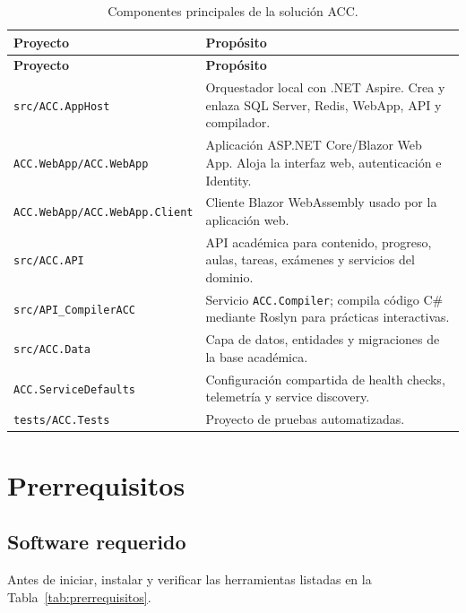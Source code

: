 \documentclass[12pt,letterpaper]{article}
\begin{document}
\begin{longtable}{p{}p{}}
\caption{Componentes principales de la soluci\'on ACC.}
\label{tab:componentes}\\
\toprule
\textbf{Proyecto} & \textbf{Prop\'osito} \\
\midrule
\endfirsthead
\toprule
\textbf{Proyecto} & \textbf{Prop\'osito} \\
\midrule
\endhead
\texttt{src/ACC.AppHost} & Orquestador local con .NET Aspire. Crea y enlaza SQL Server, Redis, WebApp, API y compilador. \\
\texttt{ACC.WebApp/ACC.WebApp} & Aplicaci\'on ASP.NET Core/Blazor Web App. Aloja la interfaz web, autenticaci\'on e Identity. \\
\texttt{ACC.WebApp/ACC.WebApp.Client} & Cliente Blazor WebAssembly usado por la aplicaci\'on web. \\
\texttt{src/ACC.API} & API acad\'emica para contenido, progreso, aulas, tareas, ex\'amenes y servicios del dominio. \\
\texttt{src/API\_CompilerACC} & Servicio \texttt{ACC.Compiler}; compila c\'odigo C\# mediante Roslyn para pr\'acticas interactivas. \\
\texttt{src/ACC.Data} & Capa de datos, entidades y migraciones de la base acad\'emica. \\
\texttt{ACC.ServiceDefaults} & Configuraci\'on compartida de health checks, telemetr\'ia y service discovery. \\
\texttt{tests/ACC.Tests} & Proyecto de pruebas automatizadas. \\
\bottomrule
\end{longtable}

\section{Prerrequisitos}

\subsection{Software requerido}

Antes de iniciar, instalar y verificar las herramientas listadas en la Tabla~\ref{tab:prerrequisitos}.
\end{document}
